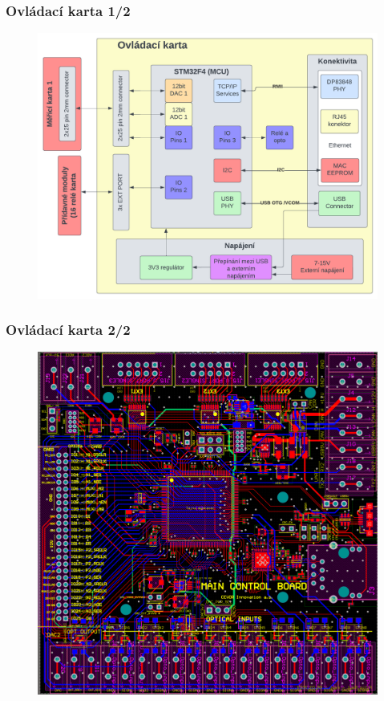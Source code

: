 \documentclass[%
  12pt,       				%
	t,                  %
	aspectratio=1610,   %
	unicode,						%
]{beamer}				    	%
\begin{document}
\begin{frame} 
	\frametitle{Ovládací karta 1/2}

	\begin{figure}[ht!]
		\centering
		\includegraphics[height = 0.8\textheight]{obrazky/ovladaci_karta_diag.png}
	\end{figure}
\end{frame}

\begin{frame} 
	\frametitle{Ovládací karta 2/2}

	\begin{figure}[ht!]
		\centering
		\includegraphics[height = 0.8\textheight]{obrazky/all_layers_no_poly_control.png}
	\end{figure}
\end{frame}
\end{document}
